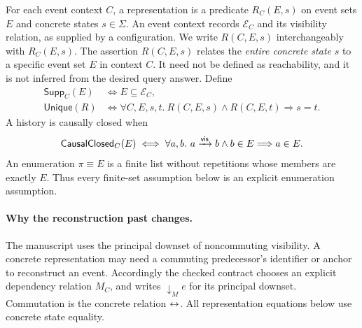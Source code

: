 \begin{definition}\label{def:representation}
For each event context $C$, a representation is a predicate $R_C(E,s)$
on event sets $E$ and concrete states $s\in\Sigma$. An event context records
$\mathcal E_C$ and its visibility relation, as supplied by a configuration.
We write $R(C,E,s)$ interchangeably with $R_C(E,s)$.
The assertion $R(C,E,s)$ relates the \emph{entire concrete state} $s$ to a
specific event set $E$ in context $C$. It need not be defined as reachability,
and it is not inferred from the desired query answer. Define
\[
\begin{aligned}
 \mathsf{Supp}_C(E)&\iff E\subseteq\mathcal E_C,\\
 \mathsf{Unique}(R)&\iff
   \forall C,E,s,t.\ R(C,E,s)\land R(C,E,t)\Longrightarrow s=t.
\end{aligned}
\]
A history is causally closed when
\[
 \mathsf{CausalClosed}_C(E)\iff
 \forall a,b.\ a\mathrel{\xrightarrow{\mathsf{vis}}} b\land b\in E\Longrightarrow a\in E.
\]
An enumeration $\pi\equiv E$ is a finite list without repetitions whose
members are exactly $E$. Thus every finite-set assumption below is an
explicit enumeration assumption.
\end{definition}

\paragraph{Why the reconstruction past changes.}
The manuscript uses the principal downset of noncommuting visibility.
A concrete representation may need a commuting predecessor's identifier
or anchor to reconstruct an event. Accordingly the checked contract chooses
an explicit dependency relation $M_C$, and writes
$\downarrow_M e$ for its principal downset. Commutation is the concrete relation $\leftrightarrow$. All representation equations
below use concrete state equality.

